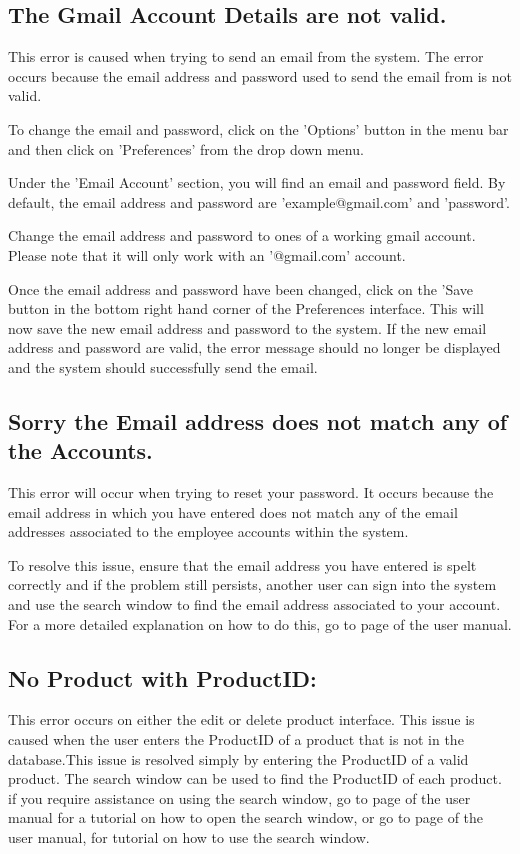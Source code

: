 \subsection{The Gmail Account Details are not valid.}

This error is caused when trying to send an email from the system. The error occurs because the email address and password used to send the email from is not valid.

To change the email and password, click on the 'Options' button in the menu bar and then click on 'Preferences' from the drop down menu.

Under the 'Email Account' section, you will find an email and password field. By default, the email address and password are 'example@gmail.com' and 'password'.

Change the email address and password to ones of a working gmail account. Please note that it will only work with an '@gmail.com' account.

Once the email address and password have been changed, click on the 'Save button in the bottom right hand corner of the Preferences interface. This will now save the new email address and password to the system. If the new email address and password are valid, the error message should no longer be displayed and the system should successfully send the email.

\subsection{Sorry the Email address does not match any of the Accounts.}

This error will occur when trying to reset your password. It occurs because the email address in which you have entered does not match any of the email addresses associated to the employee accounts within the system.

To resolve this issue, ensure that the email address you have entered is spelt correctly and if the problem still persists, another user can sign into the system and use the search window to find the email address associated to your account. For a more detailed explanation on how to do this, go to page \pageref{fig:Using the search window} of the user manual.

\subsection{No Product with ProductID:}

This error occurs on either the edit or delete product interface. This issue is caused when the user enters the ProductID of a product that is not in the database.This issue is resolved simply by entering the ProductID of a valid product. The search window can be used to find the ProductID of each product. if you require assistance on using the search window, go to page \pageref{fig:Accessing the search window} of the user manual for a tutorial on how to open the search window, or go to page \pageref{fig:Using the search window} of the user manual, for tutorial on how to use the search window.

